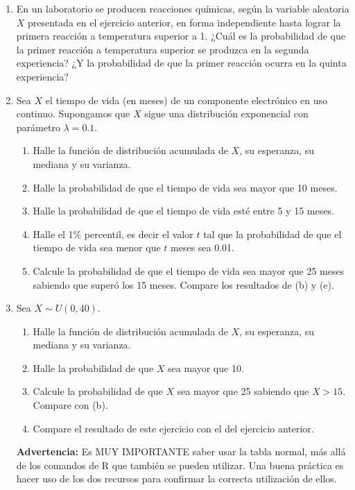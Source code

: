 \documentclass[a4paper, 11pt]{article}
\begin{document}
\begin{enumerate}
    \item En un laboratorio se producen reacciones químicas, según la variable aleatoria $X$ presentada en el ejercicio anterior, en forma independiente hasta lograr la primera reacción a temperatura superior a 1. ¿Cuál es la probabilidad de que la primer reacción a temperatura superior se produzca en la segunda experiencia? ¿Y la probabilidad de que la primer reacción ocurra en la quinta experiencia?
    
    \item Sea $X$ el tiempo de vida (en meses) de un componente electrónico en uso continuo. Supongamos que $X$ sigue una distribución exponencial con parámetro $\lambda = 0.1$.
    \begin{enumerate}
        \item Halle la función de distribución acumulada de $X$, su esperanza, su mediana y su varianza.
        \item Halle la probabilidad de que el tiempo de vida sea mayor que 10 meses.
        \item Halle la probabilidad de que el tiempo de vida esté entre 5 y 15 meses.
        \item Halle el 1\% percentil, es decir el valor $t$ tal que la probabilidad de que el tiempo de vida sea menor que $t$ meses sea 0.01.
        \item Calcule la probabilidad de que el tiempo de vida sea mayor que 25 meses sabiendo que superó los 15 meses. Compare los resultados de (b) y (e).
    \end{enumerate}
    
    \item Sea $X \sim U(0, 40)$.
    \begin{enumerate}
        \item Halle la función de distribución acumulada de $X$, su esperanza, su mediana y su varianza.
        \item Halle la probabilidad de que $X$ sea mayor que 10.
        \item Calcule la probabilidad de que $X$ sea mayor que 25 sabiendo que $X > 15$. Compare con (b).
        \item Compare el resultado de este ejercicio con el del ejercicio anterior.
    \end{enumerate}
    
    \textbf{Advertencia:} Es MUY IMPORTANTE saber usar la tabla normal, más allá de los comandos de R que también se pueden utilizar. Una buena práctica es hacer uso de los dos recursos para confirmar la correcta utilización de ellos.
    

\end{enumerate}
\end{document}
